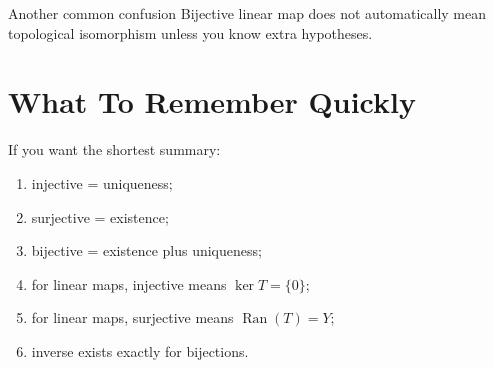 \documentclass[header={Ancillary Note: Basic Mappings},notheorems]{study-note}
\begin{document}
\begin{warningbox}{Another common confusion}
Bijective linear map does not automatically mean topological isomorphism unless you know extra hypotheses.
\end{warningbox}

\section{What To Remember Quickly}

\begin{focusbox}
If you want the shortest summary:
\begin{enumerate}
\item injective = uniqueness;
\item surjective = existence;
\item bijective = existence plus uniqueness;
\item for linear maps, injective means $\ker T=\{0\}$;
\item for linear maps, surjective means $\operatorname{Ran}(T)=Y$;
\item inverse exists exactly for bijections.
\end{enumerate}
\end{focusbox}
\end{document}

